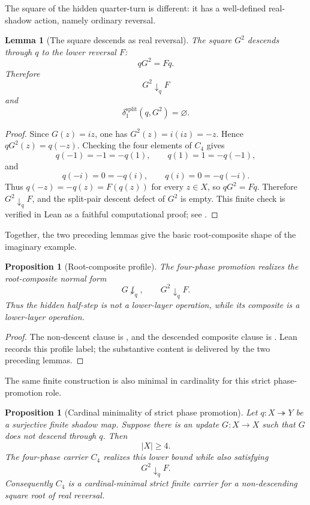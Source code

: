 \documentclass[11pt]{article}
\newtheorem{lemma}[theorem]{Lemma}
\newtheorem{proposition}[theorem]{Proposition}
\theoremstyle{definition}
\begin{document}
The square of the hidden quarter-turn is different: it has a well-defined
real-shadow action, namely ordinary reversal.

\begin{lemma}[The square descends as real reversal]
\label{lem:imag-G2-descends}
The square \(G^2\) descends through \(q\) to the lower reversal \(F\):
\[
qG^2=Fq.
\]
Therefore
\[
G^2\downarrow_q F
\]
and
\[
\delta^{\mathrm{split}}_1(q,G^2)=\varnothing.
\]
\end{lemma}

\begin{proof}
Since \(G(z)=iz\), one has \(G^2(z)=i(iz)=-z\).  Hence \(qG^2(z)=q(-z)\).
Checking the four elements of \(C_4\) gives
\[
q(-1)=-1=-q(1),
\qquad
q(1)=1=-q(-1),
\]
and
\[
q(-i)=0=-q(i),
\qquad
q(i)=0=-q(-i).
\]
Thus \(q(-z)=-q(z)=F(q(z))\) for every \(z\in X\), so \(qG^2=Fq\).  Therefore
\(G^2\downarrow_q F\), and the split-pair descent defect of \(G^2\) is empty.
This finite check is verified in Lean as a faithful computational proof; see
.
\end{proof}

Together, the two preceding lemmas give the basic root-composite shape of the
imaginary example.

\begin{proposition}[Root-composite profile]
\label{prop:imag-root-composite-profile}
The four-phase promotion realizes the root-composite normal form
\[
G\not\downarrow_q,
\qquad
G^2\downarrow_q F.
\]
Thus the hidden half-step is not a lower-layer operation, while its composite is a lower-layer operation.
\end{proposition}

\begin{proof}
The non-descent clause is , and the descended
composite clause is .  Lean records this profile
label; the substantive content is delivered by the two preceding lemmas.
\end{proof}

The same finite construction is also minimal in cardinality for this
strict phase-promotion role.

\begin{proposition}[Cardinal minimality of strict phase promotion]
\label{prop:imag-cardinal-minimality}
Let \(q:X\twoheadrightarrow Y\) be a surjective finite shadow map.  Suppose there is an update \(G:X\to X\) such that \(G\) does not descend through \(q\).  Then
\[
|X|\geq 4.
\]
The four-phase carrier \(C_4\) realizes this lower bound while also satisfying
\[
G^2\downarrow_q F.
\]
Consequently \(C_4\) is a cardinal-minimal strict finite carrier for a non-descending square root of real reversal.
\end{proposition}
\end{document}
